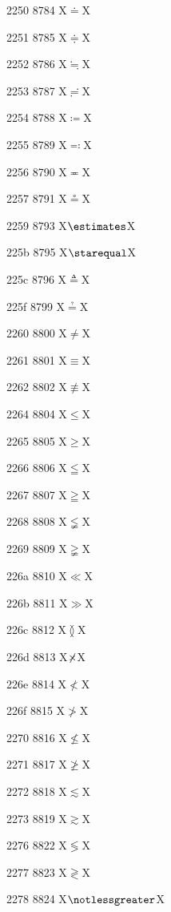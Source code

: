 \documentclass[11pt]{article}
\begin{document}
2250 8784 X{\ensuremath{\doteq}}X

2251 8785 X{\ensuremath{\doteqdot}}X

2252 8786 X{\ensuremath{\fallingdotseq}}X

2253 8787 X{\ensuremath{\risingdotseq}}X

2254 8788 X{\ensuremath{\coloneq}}X

2255 8789 X{\ensuremath{\eqcolon}}X

2256 8790 X{\ensuremath{\eqcirc}}X

2257 8791 X{\ensuremath{\circeq}}X

2259 8793 X{\ensuremath{\estimates}}X

225b 8795 X{\ensuremath{\starequal}}X

225c 8796 X{\ensuremath{\triangleq}}X

225f 8799 X{\ensuremath{\questeq}}X

2260 8800 X{\ensuremath{\ne}}X

2261 8801 X{\ensuremath{\equiv}}X

2262 8802 X{\ensuremath{\nequiv}}X

2264 8804 X{\ensuremath{\leq}}X

2265 8805 X{\ensuremath{\geq}}X

2266 8806 X{\ensuremath{\leqq}}X

2267 8807 X{\ensuremath{\geqq}}X

2268 8808 X{\ensuremath{\lneqq}}X

2269 8809 X{\ensuremath{\gneqq}}X

226a 8810 X{\ensuremath{\ll}}X

226b 8811 X{\ensuremath{\gg}}X

226c 8812 X{\ensuremath{\between}}X

226d 8813 X{\ensuremath{\not\kern-0.3em\times}}X

226e 8814 X{\ensuremath{\nless}}X

226f 8815 X{\ensuremath{\ngtr}}X

2270 8816 X{\ensuremath{\nleq}}X

2271 8817 X{\ensuremath{\ngeq}}X

2272 8818 X{\ensuremath{\lesssim}}X

2273 8819 X{\ensuremath{\gtrsim}}X

2276 8822 X{\ensuremath{\lessgtr}}X

2277 8823 X{\ensuremath{\gtrless}}X

2278 8824 X{\ensuremath{\notlessgreater}}X
\end{document}
